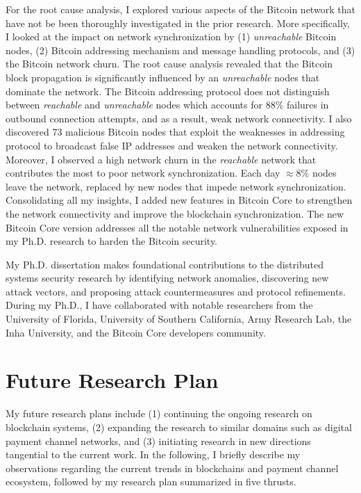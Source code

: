 \documentclass{NSF}
\begin{document}
 
For the root cause analysis, I explored various aspects of the Bitcoin network that have not be been thoroughly investigated in the prior research. More specifically, I looked at the impact on network synchronization by (1) {\em unreachable} Bitcoin nodes, (2) Bitcoin addressing mechanism and message handling protocols, and (3) the Bitcoin network churn. The root cause analysis revealed that the Bitcoin block propagation is significantly influenced by an {\em unreachable} nodes that dominate the network. The Bitcoin addressing protocol does not distinguish between {\em reachable} and {\em unreachable} nodes which accounts for 88\% failures in outbound connection attempts, and as a result, weak network connectivity. I also discovered 73 malicious Bitcoin nodes that exploit the weaknesses in addressing protocol to broadcast false IP addresses and weaken the network connectivity. Moreover, I observed a high network churn in the {\em reachable} network that contributes the most to poor network synchronization. Each day $\approx$8\% nodes leave the network, replaced by new nodes that impede network synchronization. Consolidating all my insights, I added new features in Bitcoin Core to strengthen the network connectivity and improve the blockchain synchronization. The new Bitcoin Core version addresses all the notable network vulnerabilities exposed in my Ph.D. research to harden the Bitcoin security.  

\vspace{2mm}
My Ph.D. dissertation makes foundational contributions to the distributed systems security research by identifying network anomalies, discovering new attack vectors, and proposing attack countermeasures and protocol refinements. During my Ph.D., I have collaborated with notable researchers from the University of Florida, University of Southern California, Army Research Lab, the Inha University, and the Bitcoin Core developers community.  



\section{Future Research Plan}
My future research plans include (1) continuing the ongoing research on blockchain systems, (2) expanding the research to similar domains such as digital payment channel networks, and (3) initiating research in new directions tangential to the current work. In the following, I briefly describe my observations regarding the current trends in blockchains and payment channel ecosystem, followed by my research plan summarized in five thrusts.  
\end{document}
